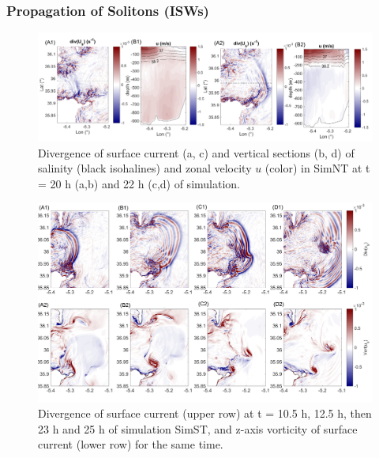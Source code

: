 \subsubsection{Propagation of Solitons (ISWs)}
\label{section_sim3D_ISW}

\begin{figure}[!h]
 \centering
 \includegraphics[width=1.\textwidth]{./GBR3D/coupesISW_ME2-2.png}
 \caption {Divergence of surface current (a, c) and vertical sections (b, d) of salinity (black isohalines) and zonal velocity $u$ (color) in SimNT at t = 20 h (a,b) and 22 h (c,d) of simulation.}
  \label{FigISWNT}
\end{figure}

\begin{figure}[!h]
 \centering
\includegraphics[width=\linewidth]{./GBR3D/FigTourbVE2.png}
 \caption {Divergence of surface current (upper row) at t = 10.5 h, 12.5 h, then 23 h and 25 h of simulation SimST, and z-axis vorticity of surface current (lower row) for the same time.}
 \label{FigeddGBR3D}
\end{figure}

